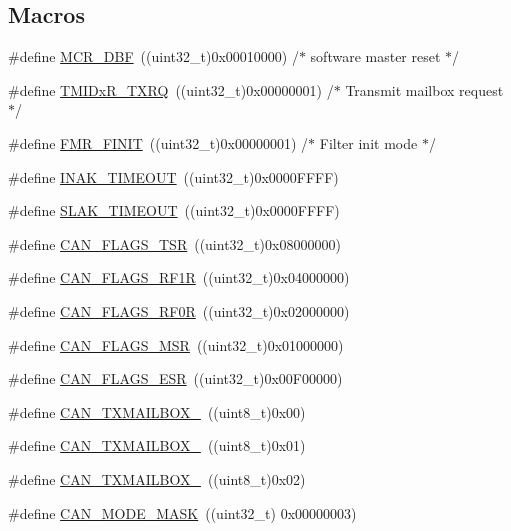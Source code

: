 \subsection*{Macros}
\begin{DoxyCompactItemize}
\item 
\#define \hyperlink{group___c_a_n___private___defines_ga1ded3736beb63c49281f2983fc68c36d}{M\+C\+R\+\_\+\+D\+BF}~((uint32\+\_\+t)0x00010000) /$\ast$ software master reset $\ast$/
\item 
\#define \hyperlink{group___c_a_n___private___defines_gabeb6db5ba5c01da5084ec1605f868e18}{T\+M\+I\+Dx\+R\+\_\+\+T\+X\+RQ}~((uint32\+\_\+t)0x00000001) /$\ast$ Transmit mailbox request $\ast$/
\item 
\#define \hyperlink{group___c_a_n___private___defines_ga6125d0273c466e402db1a8f5bf888857}{F\+M\+R\+\_\+\+F\+I\+N\+IT}~((uint32\+\_\+t)0x00000001) /$\ast$ Filter init mode $\ast$/
\item 
\#define \hyperlink{group___c_a_n___private___defines_ga60a32132df242146efd3e9f7a079f0f0}{I\+N\+A\+K\+\_\+\+T\+I\+M\+E\+O\+UT}~((uint32\+\_\+t)0x0000\+F\+F\+F\+F)
\item 
\#define \hyperlink{group___c_a_n___private___defines_ga1bb8107706c8b4039ac55a122f3c65bb}{S\+L\+A\+K\+\_\+\+T\+I\+M\+E\+O\+UT}~((uint32\+\_\+t)0x0000\+F\+F\+F\+F)
\item 
\#define \hyperlink{group___c_a_n___private___defines_gac67e7d905ba11441bf9e14180805cf3a}{C\+A\+N\+\_\+\+F\+L\+A\+G\+S\+\_\+\+T\+SR}~((uint32\+\_\+t)0x08000000)
\item 
\#define \hyperlink{group___c_a_n___private___defines_ga2a03d73273ab353c8deb3a4730431977}{C\+A\+N\+\_\+\+F\+L\+A\+G\+S\+\_\+\+R\+F1R}~((uint32\+\_\+t)0x04000000)
\item 
\#define \hyperlink{group___c_a_n___private___defines_ga4b22b2552759778ac07825240823a45f}{C\+A\+N\+\_\+\+F\+L\+A\+G\+S\+\_\+\+R\+F0R}~((uint32\+\_\+t)0x02000000)
\item 
\#define \hyperlink{group___c_a_n___private___defines_ga3aaa7df395ce1a90cb6e2ff3d2c4b24e}{C\+A\+N\+\_\+\+F\+L\+A\+G\+S\+\_\+\+M\+SR}~((uint32\+\_\+t)0x01000000)
\item 
\#define \hyperlink{group___c_a_n___private___defines_ga14f7bb0b320da21443c9bd60b1f86b5d}{C\+A\+N\+\_\+\+F\+L\+A\+G\+S\+\_\+\+E\+SR}~((uint32\+\_\+t)0x00\+F00000)
\item 
\#define \hyperlink{group___c_a_n___private___defines_gaa62f09d0693681cb7576f61c93b7cf0f}{C\+A\+N\+\_\+\+T\+X\+M\+A\+I\+L\+B\+O\+X\+\_}~((uint8\+\_\+t)0x00)
\item 
\#define \hyperlink{group___c_a_n___private___defines_ga4e20f0aac1ac940014a6c66971890943}{C\+A\+N\+\_\+\+T\+X\+M\+A\+I\+L\+B\+O\+X\+\_}~((uint8\+\_\+t)0x01)
\item 
\#define \hyperlink{group___c_a_n___private___defines_ga8a842aa352d72321930cc963b26bf6d7}{C\+A\+N\+\_\+\+T\+X\+M\+A\+I\+L\+B\+O\+X\+\_}~((uint8\+\_\+t)0x02)
\item 
\#define \hyperlink{group___c_a_n___private___defines_ga79094ce5a3a2f717140e8cc9b7c161b6}{C\+A\+N\+\_\+\+M\+O\+D\+E\+\_\+\+M\+A\+SK}~((uint32\+\_\+t) 0x00000003)
\end{DoxyCompactItemize}


